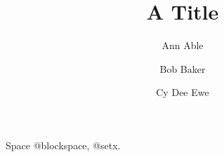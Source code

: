 \documentclass{article}
\makeatletter
\def\blockN#1{\gdef\@blockspace{0pt}#1\relax}
\def\setx#1{\gdef\@setx{set}}
\makeatother
\begin{document}
\title{A Title}
\author{\setx{unused}Ann Able \and \blockN{Bob Baker} \and \blockN{Cy {Dee} Ewe}}
\maketitle
Space \csname @blockspace\endcsname, \csname @setx\endcsname.
\end{document}
